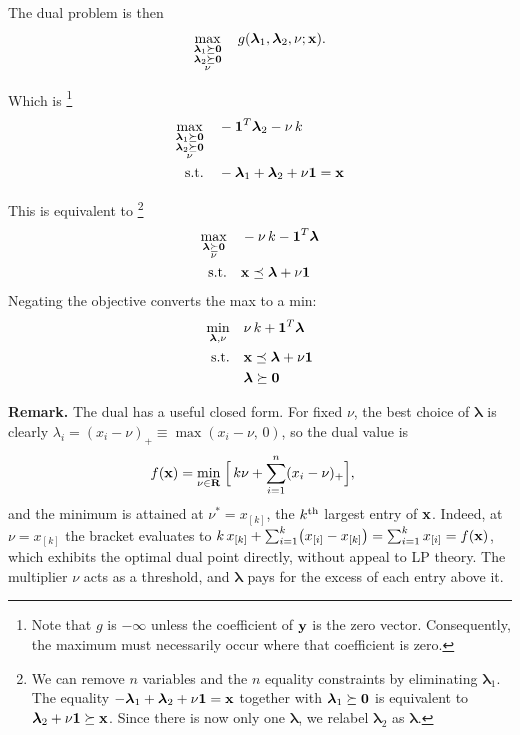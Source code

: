 \documentclass[12pt]{article}
\begin{document}
The dual problem is then
\begin{align*}
	\max_{\substack{{\boldsymbol \lambda}_1 \succeq {\bf 0} \\ {\boldsymbol \lambda}_2 \succeq {\bf 0} \\ \nu}} \quad
		g({\boldsymbol \lambda}_1, {\boldsymbol \lambda}_2, \nu; {\bf x}).
\end{align*}

Which is%
\footnote{Note that $g$ is $-\infty$ unless the coefficient of ${\bf y}$ is the zero vector.
Consequently, the maximum must necessarily occur where that coefficient is zero.}
\begin{align*}
	\max_{\substack{{\boldsymbol \lambda}_1 \succeq {\bf 0} \\ {\boldsymbol \lambda}_2 \succeq {\bf 0} \\ \nu}} \quad & -{\bf 1}^T {\boldsymbol \lambda}_2 - \nu \, k \\
	\text{s.t.} \quad & -{\boldsymbol \lambda}_1 + {\boldsymbol \lambda}_2 + \nu {\bf 1} = {\bf x}
\end{align*}

This is equivalent to%
\footnote{We can remove $n$ variables and the $n$ equality constraints by eliminating
	${\boldsymbol \lambda}_1$. The equality $-{\boldsymbol \lambda}_1 + {\boldsymbol \lambda}_2 + \nu {\bf 1} = {\bf x}$
	together with ${\boldsymbol \lambda}_1 \succeq {\bf 0}$ is equivalent to
	${\boldsymbol \lambda}_2 + \nu {\bf 1} \succeq {\bf x}$.
	Since there is now only one ${\boldsymbol \lambda}$, we relabel ${\boldsymbol \lambda}_2$ as ${\boldsymbol \lambda}$.}
\begin{align*}
	\max_{\substack{{\boldsymbol \lambda} \succeq {\bf 0} \\ \nu}} \quad & -\nu \, k - {\bf 1}^T {\boldsymbol \lambda} \\
	\text{s.t.} \quad & {\bf x} \preceq {\boldsymbol \lambda} + \nu {\bf 1}
\end{align*}
Negating the objective converts the max to a min:
\begin{align*}
	\min_{{\boldsymbol \lambda}, \nu} \quad & \nu \, k + {\bf 1}^T {\boldsymbol \lambda} \\
	\text{s.t.} \quad & {\bf x} \preceq {\boldsymbol \lambda} + \nu {\bf 1} \\
	& {\boldsymbol \lambda} \succeq {\bf 0}
\end{align*}

\textbf{Remark.} The dual has a useful closed form.  For fixed $\nu$, the
best choice of ${\boldsymbol \lambda}$ is clearly
$\lambda_i = (x_i - \nu)_+ \equiv \max(x_i - \nu,\, 0)$, so the dual value is
\begin{align*}
	f({\bf x}) &= \min_{\nu \in {\bf R}} \;
	\Bigl[\, k \nu + \sum_{i=1}^n (x_i - \nu)_+ \Bigr],
\end{align*}
and the minimum is attained at $\nu^* = x_{[k]}$, the $k^{\rm th}$ largest
entry of ${\bf x}$.  Indeed, at $\nu = x_{[k]}$ the bracket evaluates to
$k \, x_{[k]} + \sum_{i=1}^{k} \bigl(x_{[i]} - x_{[k]}\bigr)
= \sum_{i=1}^k x_{[i]} = f({\bf x})$, which exhibits the optimal dual point
directly, without appeal to LP theory.  The multiplier $\nu$ acts as a
threshold, and ${\boldsymbol \lambda}$ pays for the excess of each entry
above it.
\end{document}
